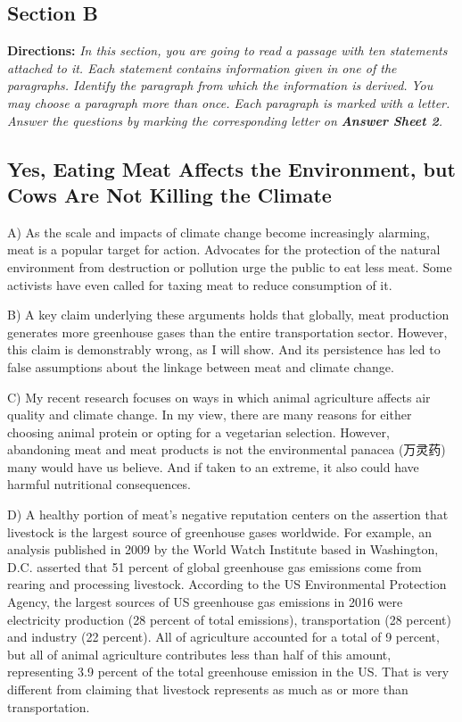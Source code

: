 \documentclass[UTF8,11pt]{ctexart}
\begin{document}
\subsection*{\textbf{Section B}}


\textbf{Directions:} \textit{In this section, you are going to read a passage with ten statements attached to it. Each statement} \textit{contains information given in one of the paragraphs. Identify the paragraph from which the information is derived.} \textit{You may choose a paragraph more than once. Each paragraph is marked with a letter. Answer the questions by} \textit{marking the corresponding letter on }\textbf{\textit{Answer Sheet 2}}\textit{.}


\subsection*{\textbf{Yes, Eating Meat Affects the Environment, but Cows Are Not Killing the Climate}}


A) As the scale and impacts of climate change become increasingly alarming, meat is a popular target for action. Advocates for the protection of the natural environment from destruction or pollution urge the public to eat less meat. Some activists have even called for taxing meat to reduce consumption of it.


B) A key claim underlying these arguments holds that globally, meat production generates more greenhouse gases than the entire transportation sector. However, this claim is demonstrably wrong, as I will show. And its persistence has led to false assumptions about the linkage between meat and climate change.


C) My recent research focuses on ways in which animal agriculture affects air quality and climate change. In my view, there are many reasons for either choosing animal protein or opting for a vegetarian selection. However, abandoning meat and meat products is not the environmental panacea (万灵药) many would have us believe. And if taken to an extreme, it also could have harmful nutritional consequences.


D) A healthy portion of meat’s negative reputation centers on the assertion that livestock is the largest source of greenhouse gases worldwide. For example, an analysis published in 2009 by the World Watch Institute based in Washington, D.C. asserted that 51 percent of global greenhouse gas emissions come from rearing and processing livestock. According to the US Environmental Protection Agency, the largest sources of US greenhouse gas emissions in 2016 were electricity production (28 percent of total emissions), transportation (28 percent) and industry (22 percent). All of agriculture accounted for a total of 9 percent, but all of animal agriculture contributes less than half of this amount, representing 3.9 percent of the total greenhouse emission in the US. That is very different from claiming that livestock represents as much as or more than transportation.
\end{document}
